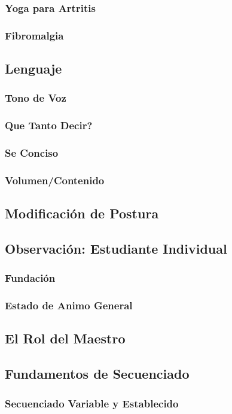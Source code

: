 \documentclass[a4paper]{article}
\begin{document}
\subsubsection{Yoga para Artritis}
\subsubsection{Fibromalgia}
\subsection{Lenguaje}
\subsubsection{Tono de Voz}
\subsubsection{Que Tanto Decir?}
\subsubsection{Se Conciso}
\subsubsection{Volumen/Contenido}
\subsection{Modificación de Postura}
\subsection{Observación: Estudiante Individual}
\subsubsection{Fundación}
\subsubsection{Estado de Animo General}
\subsection{El Rol del Maestro}
\subsection{Fundamentos de Secuenciado}
\subsubsection{Secuenciado Variable y Establecido}
\end{document}
